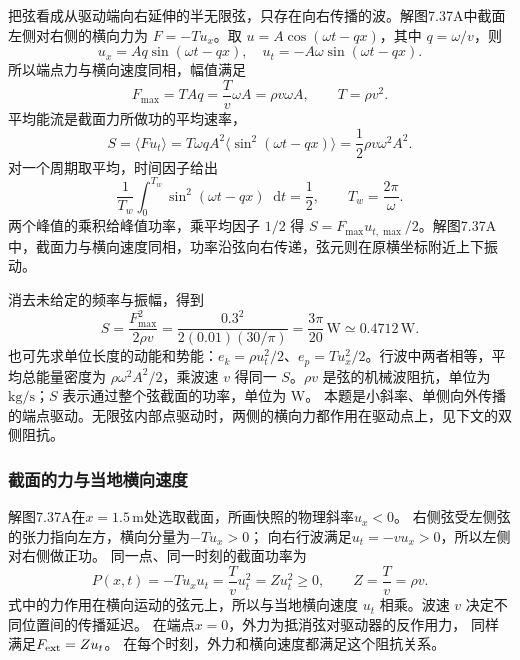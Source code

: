 \documentclass[UTF8,fontset=fandol,a4paper,11pt]{ctexart}
\newcommand{\dd}{\mathop{}\!\mathrm{d}}
\newcommand{\figcaption}[1]{\par\vspace{2pt}{\small\color{muted}#1}\par}
\begin{document}
\begin{center}\begin{minipage}{\linewidth}\centering{}\figcaption{解图 7.37A\quad 截面处位移斜率为负，截面力与横向速度同向。}\end{minipage}\end{center}
把弦看成从驱动端向右延伸的半无限弦，只存在向右传播的波。解图7.37A中截面左侧对右侧的横向力为 $F=-Tu_x$。取 $u=A\cos(\omega t-qx)$，其中 $q=\omega/v$，则
\[u_x=Aq\sin(\omega t-qx),\quad u_t=-A\omega\sin(\omega t-qx).\]
所以端点力与横向速度同相，幅值满足
\[F_{\max}=TAq=\frac{T}{v}\omega A
=\rho v\omega A,\qquad T=\rho v^2.\]
平均能流是截面力所做功的平均速率，
\[S=\langle Fu_t\rangle=T\omega q A^2\langle\sin^2(\omega t-qx)\rangle
=\frac12\rho v\omega^2A^2.\]
对一个周期取平均，时间因子给出
\[\frac1{T_w}\int_0^{T_w}\sin^2(\omega t-qx)\dd t=\frac12,
\qquad T_w=\frac{2\pi}{\omega}.\]
两个峰值的乘积给峰值功率，乘平均因子 $1/2$ 得 $S=F_{\max}u_{t,\max}/2$。解图7.37A中，截面力与横向速度同相，功率沿弦向右传递，弦元则在原横坐标附近上下振动。

消去未给定的频率与振幅，得到
\[\boxed{S=\frac{F_{\max}^2}{2\rho v}
=\frac{0.3^2}{2(0.01)(30/\pi)}=\frac{3\pi}{20}\,\mathrm W
\simeq0.4712\,\mathrm W.}\]
也可先求单位长度的动能和势能：$e_k=\rho u_t^2/2$、$e_p=Tu_x^2/2$。行波中两者相等，平均总能量密度为 $\rho\omega^2A^2/2$，乘波速 $v$ 得同一 $S$。$\rho v$ 是弦的机械波阻抗，单位为 $\mathrm{kg/s}$；$S$ 表示通过整个弦截面的功率，单位为 W。
本题是小斜率、单侧向外传播的端点驱动。无限弦内部点驱动时，两侧的横向力都作用在驱动点上，见下文的双侧阻抗。
\subsubsection*{截面的力与当地横向速度}
解图7.37A在$x=1.5\,\mathrm m$处选取截面，所画快照的物理斜率$u_x<0$。
右侧弦受左侧弦的张力指向左方，横向分量为$-Tu_x>0$；
向右行波满足$u_t=-v u_x>0$，所以左侧对右侧做正功。
同一点、同一时刻的截面功率为
\[
P(x,t)=-Tu_xu_t=\frac Tv u_t^2=Zu_t^2\ge0,\qquad Z=\frac Tv=\rho v.
\]
式中的力作用在横向运动的弦元上，所以与当地横向速度 $u_t$ 相乘。波速 $v$ 决定不同位置间的传播延迟。
在端点$x=0$，外力为抵消弦对驱动器的反作用力，
同样满足$F_{\rm ext}=Zu_t$。
在每个时刻，外力和横向速度都满足这个阻抗关系。
\end{document}
